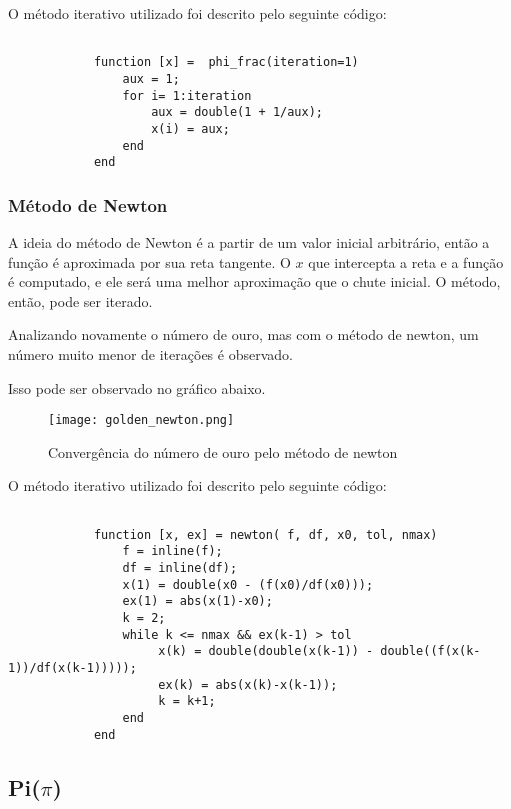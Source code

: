			O método iterativo utilizado foi descrito pelo seguinte código:

			\begin{lstlisting}

			function [x] =  phi_frac(iteration=1)
				aux = 1;
				for i= 1:iteration
					aux = double(1 + 1/aux);
					x(i) = aux;
				end
			end

			\end{lstlisting}

		\subsubsection{Método de Newton}

			A ideia do método de Newton é a partir de um valor inicial
			arbitrário, então a função é aproximada por sua reta tangente. O $x$
			que intercepta a reta e a função é computado, e ele será uma melhor
			aproximação que o chute inicial. O método, então, pode ser iterado.

			Analizando novamente o número de ouro, mas com o método de newton,
			um número muito menor de iterações é observado.

			

			Isso pode ser observado no gráfico abaixo.

			\begin{figure}[H]
				\centering
				\texttt{[image: golden\_newton.png]}
				\caption{Convergência do número de ouro pelo método de newton}
				\label{golden_newton}
			\end{figure}

			O método iterativo utilizado foi descrito pelo seguinte código:

			\begin{lstlisting}

			function [x, ex] = newton( f, df, x0, tol, nmax)
				f = inline(f);
				df = inline(df);
				x(1) = double(x0 - (f(x0)/df(x0)));
				ex(1) = abs(x(1)-x0);
				k = 2;
				while k <= nmax && ex(k-1) > tol
					 x(k) = double(double(x(k-1)) - double((f(x(k-1))/df(x(k-1)))));
					 ex(k) = abs(x(k)-x(k-1));
					 k = k+1;
				end
			end

			\end{lstlisting}

	\subsection{Pi($\pi$)}


